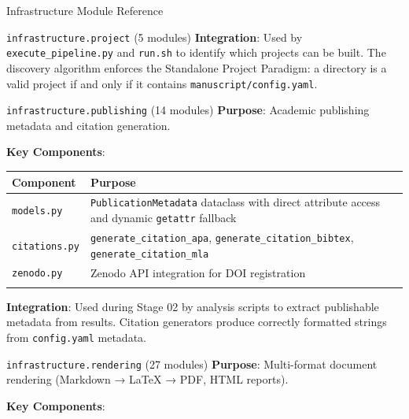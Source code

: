 \documentclass[
  ignorenonframetext,
]{beamer}
\newcounter{none} %
\begin{document}
\begin{frame}[fragile]{Infrastructure Module Reference}
\begin{block}{\texttt{infrastructure.project} (5 modules)}
\textbf{Integration}: Used by \texttt{execute\_pipeline.py} and
\texttt{run.sh} to identify which projects can be built. The discovery
algorithm enforces the Standalone Project Paradigm: a directory is a
valid project if and only if it contains
\texttt{manuscript/config.yaml}.
\end{block}

\begin{block}{\texttt{infrastructure.publishing} (14 modules)}
\protect{}\label{infrastructure.publishing-14-modules}
\textbf{Purpose}: Academic publishing metadata and citation generation.

\textbf{Key Components}:

{\def\LTcaptype{none} %
\begin{longtable}[]{@{}
  >{\raggedright\arraybackslash}p{}
  >{\raggedright\arraybackslash}p{}@{}}
\toprule\noalign{}
\begin{minipage}[b]{\linewidth}\raggedright
Component
\end{minipage} & \begin{minipage}[b]{\linewidth}\raggedright
Purpose
\end{minipage} \\
\midrule\noalign{}
\endhead
\texttt{models.py} & \texttt{PublicationMetadata} dataclass with direct
attribute access and dynamic \texttt{getattr} fallback \\
\texttt{citations.py} & \texttt{generate\_citation\_apa},
\texttt{generate\_citation\_bibtex}, \texttt{generate\_citation\_mla} \\
\texttt{zenodo.py} & Zenodo API integration for DOI registration \\
\bottomrule\noalign{}
\end{longtable}
}

\textbf{Integration}: Used during Stage 02 by analysis scripts to
extract publishable metadata from results. Citation generators produce
correctly formatted strings from \texttt{config.yaml} metadata.
\end{block}

\begin{block}{\texttt{infrastructure.rendering} (27 modules)}
\protect{}\label{infrastructure.rendering-27-modules}
\textbf{Purpose}: Multi-format document rendering (Markdown → LaTeX →
PDF, HTML reports).

\textbf{Key Components}:


\end{block}
\end{frame}
\end{document}
